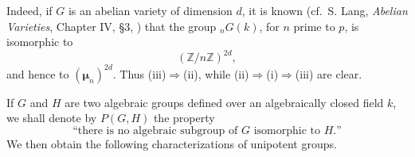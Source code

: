 

Indeed, if \(G\) is an abelian variety of dimension \(d\), it is
known (cf.\ S. Lang, \emph{Abelian Varieties}, Chapter IV, \S3,
) that the group \({}_nG(k)\), for \(n\) prime to \(p\),
is isomorphic to
\[
  (\mathbb Z/n\mathbb Z)^{2d},
\]
and hence to \((\boldsymbol\mu_n)^{2d}\).  Thus
(iii)\(\Rightarrow\)(ii), while
(ii)\(\Rightarrow\)(i)\(\Rightarrow\)(iii) are clear.


If \(G\) and \(H\) are two algebraic groups defined over an
algebraically closed field \(k\), we shall denote by \(P(G,H)\)
the property
\[
  \text{``there is no algebraic subgroup of \(G\) isomorphic to
  \(H\).''}
\]
We then obtain the following characterizations of unipotent
groups.

